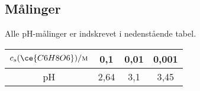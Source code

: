 \subsection*{Målinger}
Alle pH-målinger er indskrevet i nedenstående tabel.

\begin{table}[h]
    \centering
    \begin{tabular}{|c|c|c|c|}
    \hline
    $c_s(\ce{C6H8O6})/\textsc{m}$ & 0{,}1 & 0{,}01 & 0{,}001 \\ \hline
    pH & 2{,}64 & 3{,}1 & 3{,}45 \\ \hline
    \end{tabular}
\end{table}